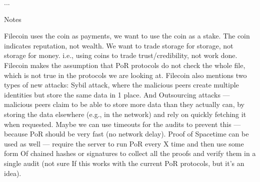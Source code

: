 ...







Notes 

Filecoin uses the coin as payments, we want to use the coin as a stake.
The coin indicates reputation, not wealth.
We want to trade storage for storage, not storage for money.
i.e., using coins to trade trust/credibility, not work done.
Filecoin makes the assumption that PoR protocols do not check the whole file,
which is not true in the protocols we are looking at.
Filecoin also mentions two types of new attacks:
Sybil attack, where the malicious peers create multiple identities but store the same data in 1 place.
And Outsourcing attacks --- malicious peers claim to be able to store more data than they actually can,
by storing the data elsewhere (e.g., in the network) and rely on quickly fetching it when requested.
Maybe we can use timeouts for the audits to prevent this --- because PoR should be very fast (no network delay).
Proof of Spacetime can be used as well --- require the server to run PoR every X time and then use some form Of
chained hashes or signatures to collect all the proofs and verify them in a single audit (not sure If
this works with the current PoR protocols, but it's an idea).
